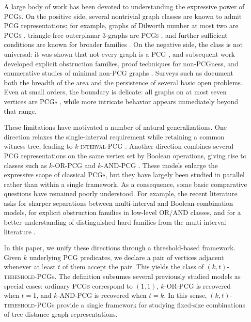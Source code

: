 \documentclass[a4paper,UKenglish,cleveref,autoref,thm-restate]{socg-lipics-v2021}
\begin{document}
A large body of work has been devoted to understanding the expressive power of \textsc{PCGs}. On the positive side, several nontrivial graph classes are known to admit \textsc{PCG} representations; for example, graphs of Dilworth number at most two are \textsc{PCGs} \cite{Calamoneri2013GraphsWDF,Calamoneri2014OnPCE}, triangle-free outerplanar $3$-graphs are \textsc{PCGs} \cite{Salma2012TriangleFreeO3AQ},  and further sufficient conditions are known for broader families \cite{Calamoneri2013OnTPAE,Hossain2016ANCAI}. On the negative side, the class is not universal: it was shown that not every graph is a \textsc{PCG} \cite{Yanhaona2010DiscoveringPCV}, and subsequent work developed explicit
obstruction families, proof techniques for non-\textsc{PCG}ness, and enumerative studies
of minimal non-\textsc{PCG} graphs
\cite{Durocher2013OnGTZ,Baiocchi2017SomeCOO,Baiocchi2018GraphsTAAO,Azam2020OnTEAJ}.
Surveys such as \cite{Rahman2020ASOA,Calamoneri2016PairwiseCGM,survey} document both the
breadth of the area and the persistence of several basic open problems. Even at small orders, the boundary is delicate: all graphs on at most seven vertices are \textsc{PCGs} \cite{Calamoneri2012AllGWN}, while more intricate behavior appears immediately beyond that range.

These limitations have motivated a number of natural generalizations. One direction relaxes the single-interval requirement while retaining a common witness tree, leading to \textsc{$k$-interval-\textsc{PCG}} \cite{Ahmed2017MultiintervalPCAP,Hayat2024AMTQ}. Another direction combines several \textsc{PCG} representations on the same vertex set by Boolean operations, giving rise to classes such as \textsc{$k$-\textsc{OR}-\textsc{PCG}} and \textsc{$k$-\textsc{AND}-\textsc{PCG}} \cite{Calamoneri2021OnGOI,survey}. These models enlarge the expressive scope of classical \textsc{PCGs}, but they have largely been studied in parallel rather than within a single framework. As a consequence, some basic comparative questions have remained poorly understood. For example, the recent literature asks for sharper separations between multi-interval and Boolean-combination models, for explicit obstruction families in low-level \textsc{OR}/\textsc{AND} classes, and for a better understanding of distinguished hard families from the multi-interval literature \cite{Calamoneri2021OnGOI,survey}.

In this paper, we unify these directions through a threshold-based framework. Given
$k$ underlying \textsc{PCG} predicates, we declare a pair of vertices adjacent whenever
at least $t$ of them accept the pair. This yields the class of
\textsc{$(k,t)$-threshold-\textsc{PCG}}s. The definition subsumes several previously
studied models as special cases: ordinary \textsc{PCGs} correspond to $(1,1)$,
\textsc{$k$-\textsc{OR}-\textsc{PCG}} is recovered when $t=1$, and
\textsc{$k$-\textsc{AND}-\textsc{PCG}} is recovered when $t=k$. In this sense,
\textsc{$(k,t)$-threshold-\textsc{PCG}}s provide a single framework for studying
fixed-size combinations of tree-distance graph representations.
\end{document}
